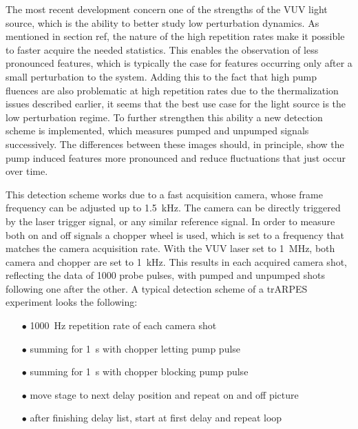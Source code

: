 The most recent development concern one of the strengths of the VUV light source, which is the ability to better study low perturbation dynamics.
As mentioned in section ref, the nature of the high repetition rates make it possible to faster acquire the needed statistics.
This enables the observation of less pronounced features, which is typically the case for features occurring only after a small perturbation to the system.
Adding this to the fact that high pump fluences are also problematic at high repetition rates due to the thermalization issues described earlier, it seems that the best use case for the light source is the low perturbation regime.
To further strengthen this ability a new detection scheme is implemented, which measures pumped and unpumped signals successively.
The differences between these images should, in principle, show the pump induced features more pronounced and reduce fluctuations that just occur over time.

This detection scheme works due to a fast acquisition camera, whose frame frequency can be adjusted up to \qty{1.5}{\kilo\hertz}.
The camera can be directly triggered by the laser trigger signal, or any similar reference signal.
In order to measure both on and off signals a chopper wheel is used, which is set to a frequency that matches the camera acquisition rate.
With the VUV laser set to \qty{1}{\mega\hertz}, both camera and chopper are set to \qty{1}{\kilo\hertz}.
This results in each acquired camera shot, reflecting the data of 1000 probe pulses, with pumped and unpumped shots following one after the other.
A typical detection scheme of a trARPES experiment looks the following:

\begin{itemize}
	\item [$\bullet$] \qty{1000}{\hertz} repetition rate of each camera shot
	\item [$\bullet$] summing for \qty{1}{\second} with chopper letting pump pulse
	\item [$\bullet$] summing for \qty{1}{\second} with chopper blocking pump pulse
	\item [$\bullet$] move stage to next delay position and repeat on and off picture
	\item [$\bullet$] after finishing delay list, start at first delay and repeat loop
\end{itemize}

